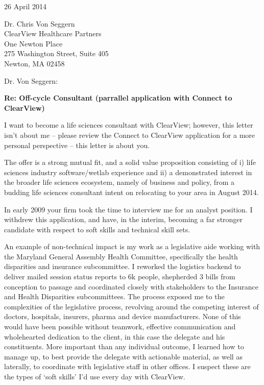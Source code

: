 \documentclass{../res}
\begin{document}
 
\begin{sloppypar}
 
%


\begin{resume} 
 
26 April 2014

Dr. Chris Von Seggern \\
ClearView Healthcare Partners \\
One Newton Place \\
275 Washington Street, Suite 405 \\
Newton, MA 02458

Dr. Von Seggern:

\textbf{Re: Off-cycle Consultant (parrallel application with Connect to ClearView)}

I want to become a life sciences consultant with ClearView; however, this letter isn't about me -- please review the Connect to ClearView application for a more personal perspective -- this letter is about you.

The offer is a strong mutual fit, and a solid value proposition consisting of i) life sciences industry software/wetlab experience and ii) a demonstrated interest in the broader life sciences ecosystem, namely of business and policy, from a budding life sciences consultant intent on relocating to your area in August 2014.

In early 2009 your firm took the time to interview me for an analyst position. I withdrew this application, and have, in the interim, becoming a far stronger candidate with respect to soft skills and technical skill sets. 

An example of non-technical impact is my work as a legislative aide working with the Maryland General Assembly Health Committee, specifically the health disparities and insurance subcommittee. I reworked the logistics backend to deliver mailed session status reports to 6k people, shepherded 3 bills from conception to passage and coordinated closely with stakeholders to the Insurance and Health Disparities subcommittees. The process exposed me to the complexities of the legislative process, revolving around the competing interest of doctors, hospitals, insurers, pharma and device manufacturers. None of this would have been possible without teamwork, effective communication and wholehearted dedication to the client, in this case the delegate and his constituents. More important than any individual outcome, I learned how to manage up, to best provide the delegate with actionable material, as well as laterally, to coordinate with legislative staff in other offices. I suspect these are the types of `soft skills' I'd use every day with ClearView.


\end{resume}
\end{sloppypar}
\end{document}
